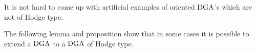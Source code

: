 \documentclass[\MainFolder/Text.tex]{subfiles}
\begin{document}

It is not hard to come up with artificial examples of oriented $\mathrm{DGA}$'s which are not of Hodge type.

The following lemma and proposition show that in some cases it is possible to extend a $\mathrm{DGA}$ to a $\mathrm{DGA}$ of Hodge type.
\end{document}
